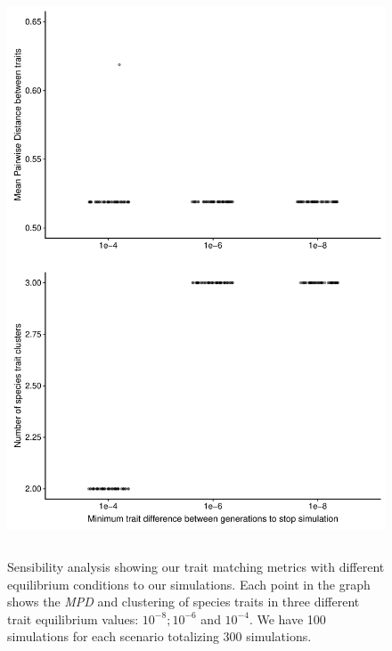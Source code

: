 \documentclass[a4paper, 12pt]{article}
\begin{document}
\begin{singlespace}
\begin{figure}[H]
 \centering
  \includegraphics[width = \linewidth, height = 17cm]{Sup_Figura_5.pdf}
  \vspace*{-7mm}
  \caption{Sensibility analysis showing our trait matching metrics with different equilibrium conditions to our simulations. Each point in the graph shows the \textit{MPD} and clustering of species traits in three different trait equilibrium values: $10^{-8}; 10^{-6}$ and $10^{-4}$. We have 100 simulations for each scenario totalizing 300 simulations.}
  \label{supfig:5}
\end{figure}


\end{singlespace}
\end{document}
